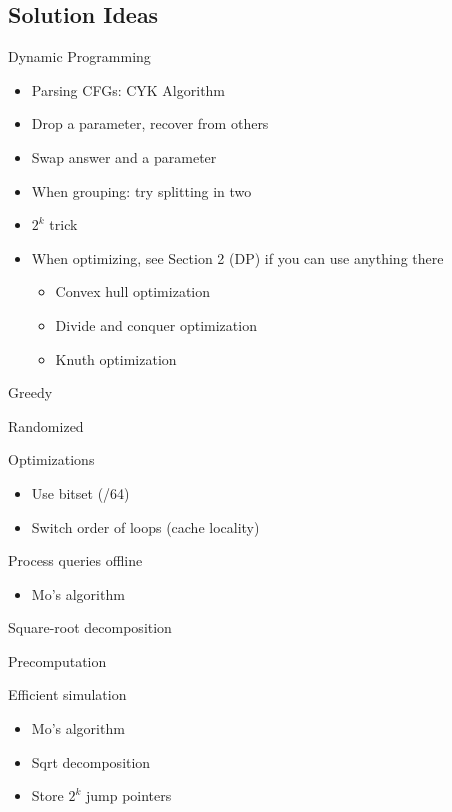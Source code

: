   \subsection{Solution Ideas}
    \begin{myitemize}
      \item Dynamic Programming
        \begin{itemize}
          \item Parsing CFGs: CYK Algorithm
          \item Drop a parameter, recover from others
          \item Swap answer and a parameter
          \item When grouping: try splitting in two
          \item $2^k$ trick
          \item When optimizing, see Section 2 (DP) if you can use anything there
              \begin{itemize}
                \item Convex hull optimization
                \item Divide and conquer optimization
                \item Knuth optimization
              \end{itemize}
        \end{itemize}
      \item Greedy
      \item Randomized
      \item Optimizations
        \begin{itemize}
          \item Use bitset (/64)
          \item Switch order of loops (cache locality)
        \end{itemize}
      \item Process queries offline
        \begin{itemize}
          \item Mo's algorithm
        \end{itemize}
      \item Square-root decomposition
      \item Precomputation
      \item Efficient simulation
        \begin{itemize}
          \item Mo's algorithm
          \item Sqrt decomposition
          \item Store $2^k$ jump pointers

\end{itemize}
\end{myitemize}

